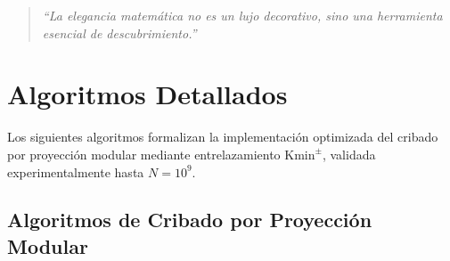 \documentclass{article}
\numberwithin{equation}{section}
\theoremstyle{plain}
\theoremstyle{definition}
\begin{document}
\begin{quote}
\textit{``La elegancia matemática no es un lujo decorativo, sino una herramienta esencial de descubrimiento.''}
\end{quote}


\appendix
\section{Algoritmos Detallados}
\label{app:algorithms}

Los siguientes algoritmos formalizan la implementación optimizada del cribado por proyección modular mediante entrelazamiento $\mathrm{Kmin}^\pm$, validada experimentalmente hasta $N=10^9$.

\subsection{Algoritmos de Cribado por Proyección Modular}
\end{document}
